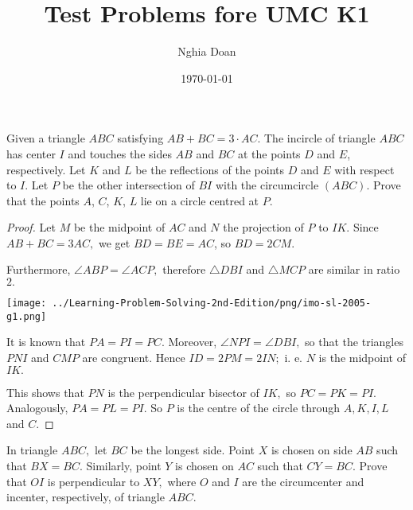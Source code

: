 \documentclass{article}
\title{Test Problems fore UMC K1}
\author{Nghia Doan}
\date{\today}
\begin{document}
\maketitle

\begin{problem}
    Given a triangle $ABC$ satisfying $AB+BC=3\cdot AC$.
    The incircle of triangle $ABC$ has center $I$ and touches the sides $AB$ and $BC$ at the points $D$ and $E$, respectively.
    Let $K$ and $L$ be the reflections of the points $D$ and $E$ with respect to $I$.
    Let $P$ be the other intersection of $BI$ with the circumcircle $(ABC).$
    Prove that the points $A$, $C$, $K$, $L$ lie on a circle centred at $P.$
\end{problem}

\begin{proof}
    Let $M$ be the midpoint of $AC$ and $N$ the projection of $P$ to $IK.$
    Since $AB + BC = 3AC,$ we get $BD = BE = AC$, so $BD = 2CM.$

    Furthermore, $\angle ABP = \angle ACP,$ therefore $\triangle DBI$ and $\triangle MCP$ are similar in ratio $2.$
    \begin{center}
        \texttt{[image: ../Learning-Problem-Solving-2nd-Edition/png/imo-sl-2005-g1.png]}
    \end{center}

    It is known that $PA = PI = PC.$
    Moreover, $\angle NPI = \angle DBI,$ so that the triangles $PNI$ and $CMP$ are congruent.
    Hence $ID = 2PM = 2IN;$ i. e. $N$ is the midpoint of $IK.$

    This shows that $PN$ is the perpendicular bisector of $IK,$ so $PC = PK = PI.$
    Analogously, $PA = PL = PI.$ So $P$ is the centre of the circle through $A, K, I, L$ and $C.$
\end{proof}

\newpage

\begin{problem}
    In triangle $ABC,$ let $BC$ be the longest side. Point $X$ is chosen on side $AB$ such that $BX = BC.$
    Similarly, point $Y$ is chosen on $AC$ such that $CY = BC.$
    Prove that $OI$ is perpendicular to $XY,$ where $O$ and $I$ are the circumcenter and incenter, respectively, of triangle $ABC.$
\end{problem}
\end{document}
